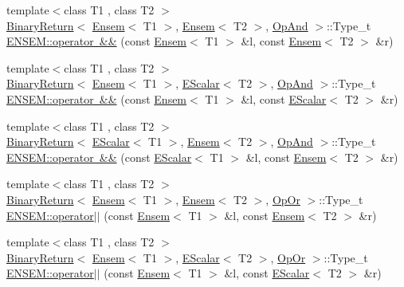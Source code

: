 \begin{DoxyCompactItemize}
\item 
{\footnotesize template$<$class T1 , class T2 $>$ }\\\mbox{\hyperlink{structENSEM_1_1BinaryReturn}{Binary\+Return}}$<$ \mbox{\hyperlink{classENSEM_1_1Ensem}{Ensem}}$<$ T1 $>$, \mbox{\hyperlink{classENSEM_1_1Ensem}{Ensem}}$<$ T2 $>$, \mbox{\hyperlink{structENSEM_1_1OpAnd}{Op\+And}} $>$\+::Type\+\_\+t \mbox{\hyperlink{group__eensem_ga1a9761f53df3f59110335a2a8cf2d67c}{E\+N\+S\+E\+M\+::operator \&\&}} (const \mbox{\hyperlink{classENSEM_1_1Ensem}{Ensem}}$<$ T1 $>$ \&l, const \mbox{\hyperlink{classENSEM_1_1Ensem}{Ensem}}$<$ T2 $>$ \&r)
\item 
{\footnotesize template$<$class T1 , class T2 $>$ }\\\mbox{\hyperlink{structENSEM_1_1BinaryReturn}{Binary\+Return}}$<$ \mbox{\hyperlink{classENSEM_1_1Ensem}{Ensem}}$<$ T1 $>$, \mbox{\hyperlink{classENSEM_1_1EScalar}{E\+Scalar}}$<$ T2 $>$, \mbox{\hyperlink{structENSEM_1_1OpAnd}{Op\+And}} $>$\+::Type\+\_\+t \mbox{\hyperlink{group__eensem_ga00415a6169d18f80656be828f11a157b}{E\+N\+S\+E\+M\+::operator \&\&}} (const \mbox{\hyperlink{classENSEM_1_1Ensem}{Ensem}}$<$ T1 $>$ \&l, const \mbox{\hyperlink{classENSEM_1_1EScalar}{E\+Scalar}}$<$ T2 $>$ \&r)
\item 
{\footnotesize template$<$class T1 , class T2 $>$ }\\\mbox{\hyperlink{structENSEM_1_1BinaryReturn}{Binary\+Return}}$<$ \mbox{\hyperlink{classENSEM_1_1EScalar}{E\+Scalar}}$<$ T1 $>$, \mbox{\hyperlink{classENSEM_1_1Ensem}{Ensem}}$<$ T2 $>$, \mbox{\hyperlink{structENSEM_1_1OpAnd}{Op\+And}} $>$\+::Type\+\_\+t \mbox{\hyperlink{group__eensem_ga327bfc24e647dfce0a0b0373f4e72084}{E\+N\+S\+E\+M\+::operator \&\&}} (const \mbox{\hyperlink{classENSEM_1_1EScalar}{E\+Scalar}}$<$ T1 $>$ \&l, const \mbox{\hyperlink{classENSEM_1_1Ensem}{Ensem}}$<$ T2 $>$ \&r)
\item 
{\footnotesize template$<$class T1 , class T2 $>$ }\\\mbox{\hyperlink{structENSEM_1_1BinaryReturn}{Binary\+Return}}$<$ \mbox{\hyperlink{classENSEM_1_1Ensem}{Ensem}}$<$ T1 $>$, \mbox{\hyperlink{classENSEM_1_1Ensem}{Ensem}}$<$ T2 $>$, \mbox{\hyperlink{structENSEM_1_1OpOr}{Op\+Or}} $>$\+::Type\+\_\+t \mbox{\hyperlink{group__eensem_ga5e2d1d875f2929ebe89f76b2d73b0a34}{E\+N\+S\+E\+M\+::operator$\vert$$\vert$}} (const \mbox{\hyperlink{classENSEM_1_1Ensem}{Ensem}}$<$ T1 $>$ \&l, const \mbox{\hyperlink{classENSEM_1_1Ensem}{Ensem}}$<$ T2 $>$ \&r)
\item 
{\footnotesize template$<$class T1 , class T2 $>$ }\\\mbox{\hyperlink{structENSEM_1_1BinaryReturn}{Binary\+Return}}$<$ \mbox{\hyperlink{classENSEM_1_1Ensem}{Ensem}}$<$ T1 $>$, \mbox{\hyperlink{classENSEM_1_1EScalar}{E\+Scalar}}$<$ T2 $>$, \mbox{\hyperlink{structENSEM_1_1OpOr}{Op\+Or}} $>$\+::Type\+\_\+t \mbox{\hyperlink{group__eensem_ga575e86e9777d7a353311ab43c237a84b}{E\+N\+S\+E\+M\+::operator$\vert$$\vert$}} (const \mbox{\hyperlink{classENSEM_1_1Ensem}{Ensem}}$<$ T1 $>$ \&l, const \mbox{\hyperlink{classENSEM_1_1EScalar}{E\+Scalar}}$<$ T2 $>$ \&r)

\end{DoxyCompactItemize}
